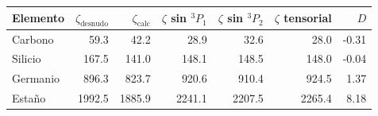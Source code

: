 \begin{tabular}{lrrrrrr}
    \toprule
    Elemento & $\zeta_{\text{desnudo}}$ & $\zeta_{\text{calc}}$ & $\zeta$ sin $^3P_1$ & $\zeta$ sin $^3P_2$ & $\zeta$ tensorial & $D$ \\
    \midrule
    Carbono & 59.3 & 42.2 & 28.9 & 32.6 & 28.0 & -0.31 \\
    Silicio & 167.5 & 141.0 & 148.1 & 148.5 & 148.0 & -0.04 \\
    Germanio & 896.3 & 823.7 & 920.6 & 910.4 & 924.5 & 1.37 \\
    Estaño & 1992.5 & 1885.9 & 2241.1 & 2207.5 & 2265.4 & 8.18 \\
    \bottomrule
\end{tabular}
